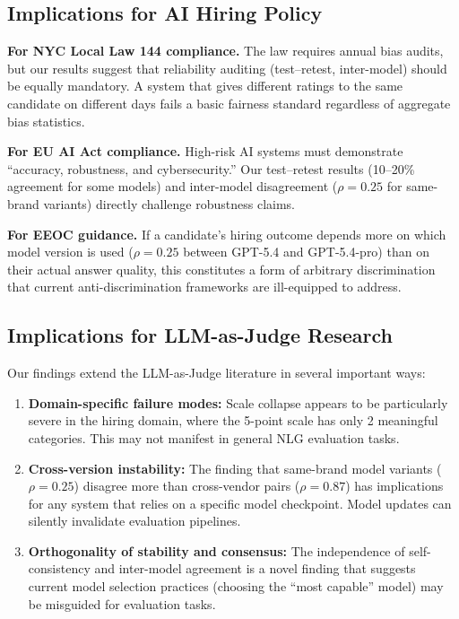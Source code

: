 \documentclass{article}
\begin{document}
\subsection{Implications for AI Hiring Policy}

\textbf{For NYC Local Law 144 compliance.} The law requires annual bias audits, but our results suggest that reliability auditing (test--retest, inter-model) should be equally mandatory. A system that gives different ratings to the same candidate on different days fails a basic fairness standard regardless of aggregate bias statistics.

\textbf{For EU AI Act compliance.} High-risk AI systems must demonstrate ``accuracy, robustness, and cybersecurity.'' Our test--retest results (10--20\% agreement for some models) and inter-model disagreement ($\rho=0.25$ for same-brand variants) directly challenge robustness claims.

\textbf{For EEOC guidance.} If a candidate's hiring outcome depends more on which model version is used ($\rho=0.25$ between GPT-5.4 and GPT-5.4-pro) than on their actual answer quality, this constitutes a form of arbitrary discrimination that current anti-discrimination frameworks are ill-equipped to address.

\subsection{Implications for LLM-as-Judge Research}

Our findings extend the LLM-as-Judge literature in several important ways:
\begin{enumerate}
  \item \textbf{Domain-specific failure modes:} Scale collapse appears to be particularly severe in the hiring domain, where the 5-point scale has only 2 meaningful categories. This may not manifest in general NLG evaluation tasks.
  \item \textbf{Cross-version instability:} The finding that same-brand model variants ($\rho=0.25$) disagree more than cross-vendor pairs ($\rho=0.87$) has implications for any system that relies on a specific model checkpoint. Model updates can silently invalidate evaluation pipelines.
  \item \textbf{Orthogonality of stability and consensus:} The independence of self-consistency and inter-model agreement is a novel finding that suggests current model selection practices (choosing the ``most capable'' model) may be misguided for evaluation tasks.
\end{enumerate}
\end{document}
